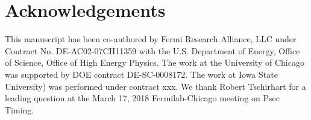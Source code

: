 
\section{Acknowledgements}
\label{thanks}
This manuscript has been co-authored by Fermi Research Alliance, LLC
under Contract No.  DE-AC02-07CH11359 with the U.S. Department of
Energy, Office of Science, Office of High Energy Physics.
The work at the University of Chicago 
was supported by DOE contract DE-SC-0008172. The work at 
Iowa State University) was performed under contract xxx. We thank Robert
Tschirhart for a leading question at the March 17, 2018 Fermilab-Chicago
meeting on Psec Timing. 

